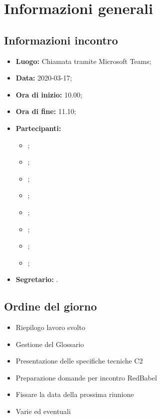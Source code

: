 \section{Informazioni generali}
\subsection{Informazioni incontro}
\begin{itemize}
	\item \textbf{Luogo:} Chiamata tramite Microsoft Teams; 
	\item \textbf{Data:} 2020-03-17;
	\item \textbf{Ora di inizio:} 10.00; 
	\item \textbf{Ora di fine:} 11.10; 
	\item \textbf{Partecipanti:}
		\begin{itemize}
			\item \VB; 
			\item \LB; 
			\item \NF; 
			\item \EG; 
			\item \FJ; 
			\item \MP; 
			\item \AS; 
			\item \AZ; 
		\end{itemize}
	\item \textbf{Segretario:} \LB. 
\end{itemize}

\subsection{Ordine del giorno}
\begin{itemize}
	\item Riepilogo lavoro svolto 
	\item Gestione del Glossario
	\item Presentazione delle specifiche tecniche C2
	\item Preparazione domande per incontro RedBabel
	\item Fissare la data della prossima riunione
	\item Varie ed eventuali
\end{itemize}
